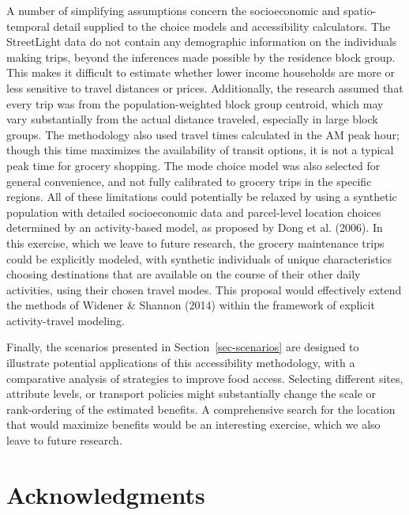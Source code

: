 \documentclass[
  letterpaper,
  number,
  review,
  3p]{elsarticle}
\begin{document}
A number of simplifying assumptions concern the socioeconomic and
spatio-temporal detail supplied to the choice models and accessibility
calculators. The StreetLight data do not contain any demographic
information on the individuals making trips, beyond the inferences made
possible by the residence block group. This makes it difficult to
estimate whether lower income households are more or less sensitive to
travel distances or prices. Additionally, the research assumed that
every trip was from the population-weighted block group centroid, which
may vary substantially from the actual distance traveled, especially in
large block groups. The methodology also used travel times calculated in
the AM peak hour; though this time maximizes the availability of transit
options, it is not a typical peak time for grocery shopping. The mode
choice model was also selected for general convenience, and not fully
calibrated to grocery trips in the specific regions. All of these
limitations could potentially be relaxed by using a synthetic population
with detailed socioeconomic data and parcel-level location choices
determined by an activity-based model, as proposed by Dong et al.
(2006). In this exercise, which we leave to future research, the grocery
maintenance trips could be explicitly modeled, with synthetic
individuals of unique characteristics choosing destinations that are
available on the course of their other daily activities, using their
chosen travel modes. This proposal would effectively extend the methods
of Widener \& Shannon (2014) within the framework of explicit
activity-travel modeling.

Finally, the scenarios presented in Section~\ref{sec-scenarios} are
designed to illustrate potential applications of this accessibility
methodology, with a comparative analysis of strategies to improve food
access. Selecting different sites, attribute levels, or transport
policies might substantially change the scale or rank-ordering of the
estimated benefits. A comprehensive search for the location that would
maximize benefits would be an interesting exercise, which we also leave
to future research.


\section*{Acknowledgments}\label{acknowledgments}

\end{document}
